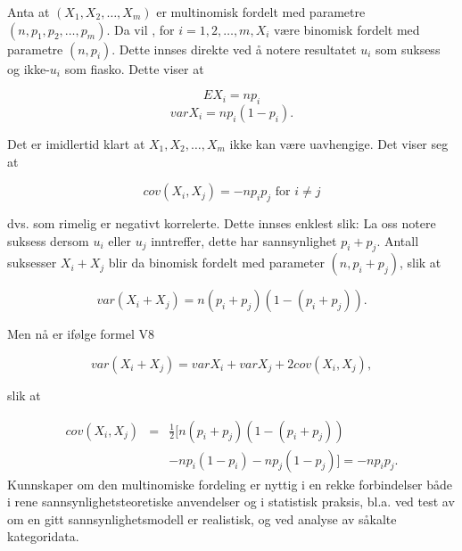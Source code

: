 Anta at $(X_1, X_2, \ldots, X_m)$ er multinomisk fordelt med
parametre $(n, p_1, p_2, \ldots, p_m)$. Da vil , for $i=1, 2, \ldots,
m, X_i$ være binomisk fordelt med parametre $(n,p_i)$. Dette
innses direkte ved å notere resultatet $u_i$ som suksess og
ikke-$u_i$ som fiasko. Dette viser at

\[          EX_i=np_i    \]
\[          varX_i=np_i(1-p_i). \]

\noindent Det er imidlertid klart at $X_1, X_2, \ldots, X_m$ ikke kan være
uavhengige. Det viser seg at

\[ cov(X_i, X_j)=-np_ip_j \mbox{\ \ for \ } i\not= j \]

\noindent dvs. som rimelig er negativt korrelerte. Dette innses enklest
slik: La oss notere suksess dersom $u_i$ eller $u_j$ inntreffer,
dette har sannsynlighet $p_i+p_j$. Antall suksesser $X_i+X_j$
blir da binomisk fordelt med parameter $(n,p_i+p_j)$, slik at

\[     var (X_i+X_j)=n(p_i+p_j)(1-(p_i+p_j)). \]

\noindent Men nå er ifølge formel V8

\[     var(X_i+X_j)=varX_i+varX_j+2cov(X_i, X_j), \]

\noindent slik at

\begin{eqnarray*}
cov(X_i, X_j)&=&\frac{1}{2}[n(p_i+p_j)(1-(p_i+p_j))\\
             & &-np_i(1-p_i)-np_j(1-p_j)]=-np_ip_j.
\end{eqnarray*}
\noindent Kunnskaper om den multinomiske fordeling er nyttig i en rekke
forbindelser både i rene sannsynlighetsteoretiske anvendelser og
i statistisk praksis, bl.a. ved test av om en gitt
sannsynlighetsmodell er realistisk, og ved analyse av såkalte
kategoridata.
\normalsize

